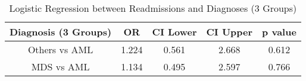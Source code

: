 \documentclass[12pt,]{article}
\begin{document}
\begin{table}[!h]

\caption{\label{tab:unnamed-chunk-46}Logistic Regression between Readmissions and Diagnoses (3 Groups)}
\centering
\begin{tabular}{ccccc}
\toprule
Diagnosis (3 Groups) & OR & CI Lower & CI Upper & p value\\
\midrule
Others vs AML & 1.224 & 0.561 & 2.668 & 0.612\\
\rowcolor[HTML]{E3E5E7}  MDS vs AML & 1.134 & 0.495 & 2.597 & 0.766\\
\bottomrule
\end{tabular}
\end{table}

\pagebreak
\end{document}
